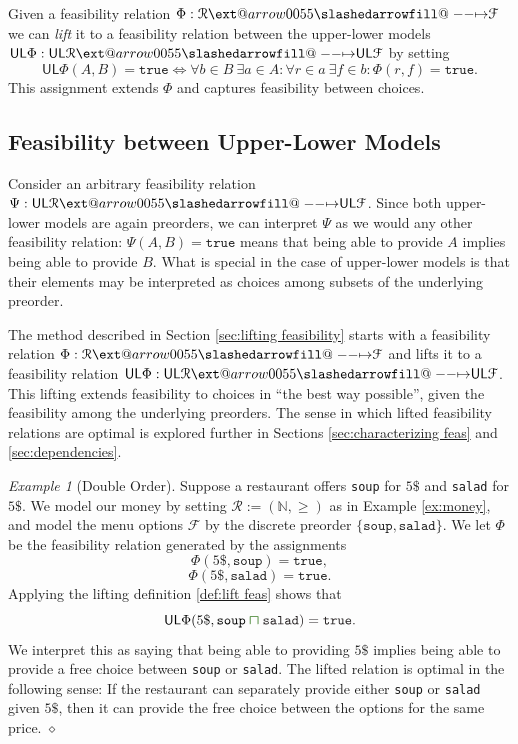 \documentclass[12pt]{article}
\makeatletter
\theoremstyle{definition}
\theoremstyle{plain}
\theoremstyle{plain}
\theoremstyle{plain}
\theoremstyle{plain}
\theoremstyle{remark}
\newtheorem{example}[definition]{Example}
\newcommand\xqed[1]{%
	\leavevmode\unskip\penalty9999 \hbox{}\nobreak\hfill
	\quad\hbox{#1}}
\newcommand\exampleend{\xqed{$\diamond$}}
\theoremstyle{remark}
\newcommand{\mc}[1]{\mathcal{#1}}
\newcommand{\low}{\mathsf{L}}
\newcommand{\upper}{\mathsf{U}}
\newcommand{\true}{\mathtt{true}}
\def\slashedarrowfill@#1#2#3#4#5{%
	$\m@th\thickmuskip0mu\medmuskip\thickmuskip\thinmuskip\thickmuskip
	\relax#5#1\mkern-7mu%
	\cleaders\hbox{$#5\mkern-2mu#2\mkern-2mu$}\hfill
	\mathclap{#3}\mathclap{#2}%
	\cleaders\hbox{$#5\mkern-2mu#2\mkern-2mu$}\hfill
	\mkern-7mu#4$%
}
\def\rightslashedarrowfill@{%
	\slashedarrowfill@\relbar\relbar\mapstochar\rightarrow}
\newcommand\xslashedrightarrow[2][]{%
	\ext@arrow 0055{\rightslashedarrowfill@}{#1}{#2}}
\newcommand{\csqcap}{\color{OliveGreen}\bm{\sqcap}\color{Black}}
\makeatother
\begin{document}
\begin{tcolorbox}[title=Lifting Feasibility to the Upper-Lower Model, colframe=Apricot, colback = paleorange, coltitle = Sepia]
	Given a feasibility relation $\Phi: \mc{R} \xslashedrightarrow{} \mc{F}$ we can \emph{lift} it to a feasibility relation between the upper-lower models $\upper\low\Phi: \upper\low\mc{R} \xslashedrightarrow{} \upper\low\mc{F}$ by setting
	$$ \upper\low\Phi(A,B) = \true \Leftrightarrow \forall b \in B \: \exists a \in A: \forall r \in a \: \exists f \in b: \Phi(r,f) = \true.$$
	This assignment extends $\Phi$ and captures feasibility between choices.
\end{tcolorbox}

\subsection{Feasibility between Upper-Lower Models}\label{sec:feas upper-lower}
Consider an arbitrary feasibility relation $\Psi: \upper\low\mc{R} \xslashedrightarrow{} \upper\low\mc{F}$. Since both upper-lower models are again preorders, we can interpret $\Psi$ as we would any other feasibility relation: $\Psi(A,B) = \true$ means that being able to provide $A$ implies being able to provide $B$. What is special in the case of upper-lower models is that their elements may be interpreted as choices among subsets of the underlying preorder.

The method described in Section \ref{sec:lifting feasibility} starts with a feasibility relation $\Phi: \mc{R} \xslashedrightarrow{} \mc{F}$ and lifts it to a feasibility relation $\upper\low\Phi: \upper\low\mc{R} \xslashedrightarrow{} \upper\low\mc{F}$. This lifting extends feasibility to choices in ``the best way possible'', given the feasibility among the underlying preorders. The sense in which lifted feasibility relations are optimal is explored further in Sections \ref{sec:characterizing feas} and \ref{sec:dependencies}.

\begin{example}[Double Order]\label{ex:double order}
	Suppose a restaurant offers \texttt{soup} for $5\$$ and \texttt{salad} for $5\$$. We model our money by setting $\mc{R} := (\mathbb{N}, \geq)$ as in Example \ref{ex:money}, and model the menu options $\mc{F}$ by the discrete preorder $\{\mathtt{soup}, \mathtt{salad} \}$. We let $\Phi$ be the feasibility relation generated by the assignments 
	$$ \Phi(5\$, \mathtt{soup}) = \true,$$
	$$ \Phi(5\$, \mathtt{salad}) = \true.$$
	Applying the lifting definition \ref{def:lift feas} shows that 
	$$\upper\low\Phi(5\$, \mathtt{soup} \csqcap \mathtt{salad}) =\true.$$
	We interpret this as saying that being able to providing $5\$$ implies being able to provide a free choice between \texttt{soup} or \texttt{salad}. The lifted relation is optimal in the following sense: If the restaurant can separately provide either \texttt{soup} or \texttt{salad} given $5\$$, then it can provide the free choice between the options for the same price. \exampleend
\end{example}
\end{document}
